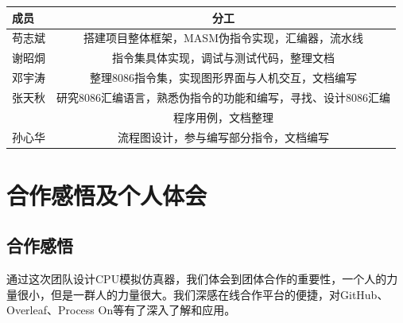 \documentclass[UTF8,12pt]{article}
\begin{document}
    \begin{table}[H]
    \begin{tabular}{l|c}
    \hline
    成员  & 分工                                          \\ \hline
    苟志斌 & 搭建项目整体框架，MASM伪指令实现，汇编器，流水线                  \\ \hline
    谢昭烔 & 指令集具体实现，调试与测试代码，整理文档                        \\ \hline
    邓宇涛 & 整理8086指令集，实现图形界面与人机交互，文档编写                  \\ \hline
    张天秋 & 研究8086汇编语言，熟悉伪指令的功能和编写，寻找、设计8086汇编\\&程序用例，文档整理 \\ \hline
    孙心华 & 流程图设计，参与编写部分指令，文档编写                       \\ \hline
    \end{tabular}
    \end{table}
	
	\section{合作感悟及个人体会}	
	\subsection{合作感悟}
	通过这次团队设计CPU模拟仿真器，我们体会到团体合作的重要性，一个人的力量很小，但是一群人的力量很大。我们深感在线合作平台的便捷，对GitHub、Overleaf、Process On等有了深入了解和应用。
\end{document}
